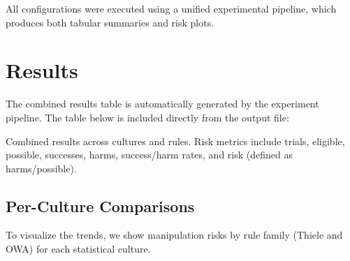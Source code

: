 \documentclass[11pt]{article}
\begin{document}
All configurations were executed using a unified experimental pipeline,
which produces both tabular summaries and risk plots.

\section{Results}
The combined results table is automatically generated by the experiment
pipeline. The table below is included directly from the output file:

\begin{table}[h!]
\centering
\resizebox{\textwidth}{!}{%

}
\caption{Combined results across cultures and rules. Risk metrics include trials,
eligible, possible, successes, harms, success/harm rates, and risk
(defined as harms/possible).}
\label{tab:combined}
\end{table}

\subsection{Per-Culture Comparisons}
To visualize the trends, we show manipulation risks by rule family (Thiele and OWA)
for each statistical culture.
\end{document}
